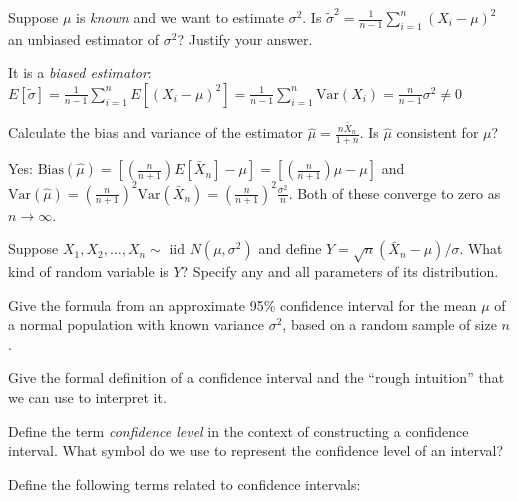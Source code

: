\documentclass[addpoints,12pt]{exam}
\begin{document}
\begin{questions}
\question Suppose $\mu$ is \emph{known} and we want to estimate $\sigma^2$. Is $\widetilde{\sigma}^2 = \frac{1}{n-1}\sum_{i=1}^n (X_i - \mu)^2$ an unbiased estimator of $\sigma^2$?
Justify your answer.
\begin{solution}
  It is a \emph{biased estimator}: $E[\widetilde{\sigma}] = \frac{1}{n-1} \sum_{i=1}^n E[(X_i - \mu)^2] = \frac{1}{n-1} \sum_{i=1}^n \mbox{Var}(X_i) = \frac{n}{n-1} \sigma^2 \neq 0$
\end{solution}

\question Calculate the bias and variance of the estimator  $\widehat{\mu} = \displaystyle\frac{n \bar{X}_n}{1 + n}$.
Is $\widehat{\mu}$ consistent for $\mu$? 
\begin{solution}
  Yes: $\mbox{Bias}(\widehat{\mu}) = \left[ \left( \frac{n}{n+1} \right)E[\bar{X}_n] - \mu\right] = \left[ \left( \frac{n}{n+1} \right)\mu  - \mu\right]$ and $\mbox{Var}(\widehat{\mu}) = \left( \frac{n}{n+1} \right)^2 \mbox{Var}(\bar{X}_n) = \left( \frac{n}{n+1} \right)^2 \frac{\sigma^2}{n}$.
  Both of these converge to zero as $n \rightarrow \infty$.
\end{solution}


\question Suppose $X_1, X_2, \dots, X_n \sim \text{ iid } N(\mu, \sigma^2)$ and define $Y = \sqrt{n}(\bar{X}_n - \mu)/\sigma$. What kind of random variable is $Y$? Specify any and all parameters of its distribution.

\question Give the formula from an approximate 95\% confidence interval for the mean $\mu$ of a normal population with known variance $\sigma^2$, based on a random sample of size $n$.

\question Give the formal definition of a confidence interval and the ``rough intuition'' that we can use to interpret it.

\question Define the term \emph{confidence level} in the context of constructing a confidence interval. What symbol do we use to represent the confidence level of an interval?

\question Define the following terms related to confidence intervals:
\end{questions}
\end{document}

